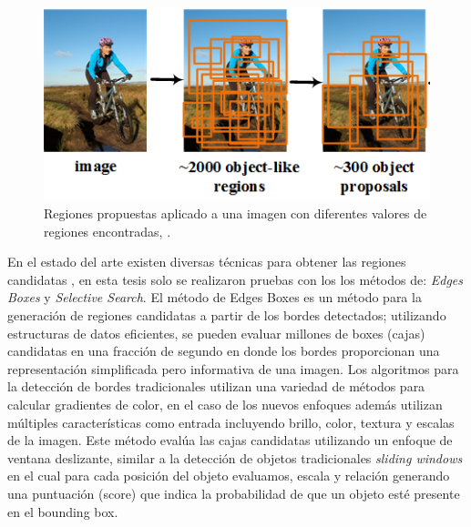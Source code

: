 \begin{figure}[H] \centering
  \includegraphics[scale=0.6,keepaspectratio=true,clip=true]{imagenes/MarcoTeorico/regionProposal.png}
  \caption{Regiones propuestas aplicado a una imagen con diferentes valores de regiones encontradas, \citep{regions_proposal_gr}.}
	\label{Fig: propsalregion}
\end{figure}

En el estado del arte existen diversas técnicas para obtener las regiones candidatas \citep{proposal}, en esta tesis  solo se realizaron pruebas con los  los métodos de: \textit{Edges Boxes} y \textit{Selective Search}. El método de Edges Boxes  \citep{edges} es un método para la generación de regiones candidatas a partir de los bordes detectados; utilizando estructuras de datos eficientes, se pueden evaluar millones de boxes (cajas) candidatas en una fracción de segundo en donde los bordes proporcionan una representación simplificada pero informativa de una imagen. Los algoritmos para la detección de bordes tradicionales utilizan una variedad de métodos para calcular gradientes de color, en el caso de los nuevos enfoques además utilizan múltiples características como entrada incluyendo brillo, color, textura y  escalas de la imagen. Este método evalúa las cajas candidatas utilizando un enfoque de ventana deslizante, similar a la detección de objetos tradicionales \textit{sliding windows} en el cual para cada posición del objeto evaluamos, escala y relación generando una puntuación (score) que indica la probabilidad de que un objeto esté presente en el bounding box.


